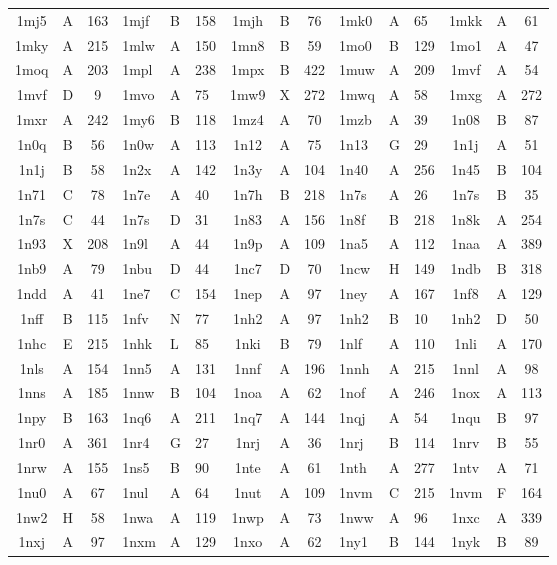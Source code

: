 \begin{longtable}{|c|c|c| a|a|a| c|c|c| a|a|a| c|c|c|}
1mj5 & A & 163 & 1mjf & B & 158 & 1mjh & B & 76 & 1mk0 & A & 65 & 1mkk & A & 61\\
1mky & A & 215 & 1mlw & A & 150 & 1mn8 & B & 59 & 1mo0 & B & 129 & 1mo1 & A & 47\\
1moq & A & 203 & 1mpl & A & 238 & 1mpx & B & 422 & 1muw & A & 209 & 1mvf & A & 54\\
1mvf & D & 9 & 1mvo & A & 75 & 1mw9 & X & 272 & 1mwq & A & 58 & 1mxg & A & 272\\
1mxr & A & 242 & 1my6 & B & 118 & 1mz4 & A & 70 & 1mzb & A & 39 & 1n08 & B & 87\\
1n0q & B & 56 & 1n0w & A & 113 & 1n12 & A & 75 & 1n13 & G & 29 & 1n1j & A & 51\\
1n1j & B & 58 & 1n2x & A & 142 & 1n3y & A & 104 & 1n40 & A & 256 & 1n45 & B & 104\\
1n71 & C & 78 & 1n7e & A & 40 & 1n7h & B & 218 & 1n7s & A & 26 & 1n7s & B & 35\\
1n7s & C & 44 & 1n7s & D & 31 & 1n83 & A & 156 & 1n8f & B & 218 & 1n8k & A & 254\\
1n93 & X & 208 & 1n9l & A & 44 & 1n9p & A & 109 & 1na5 & A & 112 & 1naa & A & 389\\
1nb9 & A & 79 & 1nbu & D & 44 & 1nc7 & D & 70 & 1ncw & H & 149 & 1ndb & B & 318\\
1ndd & A & 41 & 1ne7 & C & 154 & 1nep & A & 97 & 1ney & A & 167 & 1nf8 & A & 129\\
1nff & B & 115 & 1nfv & N & 77 & 1nh2 & A & 97 & 1nh2 & B & 10 & 1nh2 & D & 50\\
1nhc & E & 215 & 1nhk & L & 85 & 1nki & B & 79 & 1nlf & A & 110 & 1nli & A & 170\\
1nls & A & 154 & 1nn5 & A & 131 & 1nnf & A & 196 & 1nnh & A & 215 & 1nnl & A & 98\\
1nns & A & 185 & 1nnw & B & 104 & 1noa & A & 62 & 1nof & A & 246 & 1nox & A & 113\\
1npy & B & 163 & 1nq6 & A & 211 & 1nq7 & A & 144 & 1nqj & A & 54 & 1nqu & B & 97\\
1nr0 & A & 361 & 1nr4 & G & 27 & 1nrj & A & 36 & 1nrj & B & 114 & 1nrv & B & 55\\
1nrw & A & 155 & 1ns5 & B & 90 & 1nte & A & 61 & 1nth & A & 277 & 1ntv & A & 71\\
1nu0 & A & 67 & 1nul & A & 64 & 1nut & A & 109 & 1nvm & C & 215 & 1nvm & F & 164\\
1nw2 & H & 58 & 1nwa & A & 119 & 1nwp & A & 73 & 1nww & A & 96 & 1nxc & A & 339\\
1nxj & A & 97 & 1nxm & A & 129 & 1nxo & A & 62 & 1ny1 & B & 144 & 1nyk & B & 89\\

\end{longtable}
